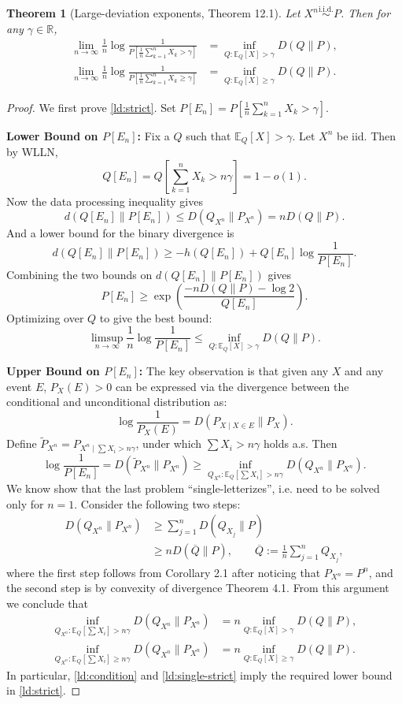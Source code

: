 \documentclass[UTF8,11pt,a4paper]{ctexart}
\newtheorem*{theorem}{Theorem}
\theoremstyle{definition}\newtheorem*{definition}{Definition}
\theoremstyle{remark}\newtheorem*{remark}{Remark}
\newcommand{\R}{\mathbb R}
\newcommand{\E}{\mathbb E}
\begin{document}
\begin{theorem}[Large-deviation exponents, Theorem 12.1]
Let $X^n\stackrel{\mathrm{i.i.d.}}{\sim}P$. Then for any $\gamma\in\R$,
\begin{align}
\lim_{n\to\infty}\frac1n\log\frac1{P[\frac1n\sum_{k=1}^n X_k>\gamma]}
&=\inf_{Q:\E_Q[X]>\gamma}D(Q\|P),\label{ld:strict}\\
\lim_{n\to\infty}\frac1n\log\frac1{P[\frac1n\sum_{k=1}^n X_k\ge\gamma]}
&=\inf_{Q:\E_Q[X]\ge\gamma}D(Q\|P).\label{ld:closed}
\end{align}
\end{theorem}
\begin{proof}
We first prove \eqref{ld:strict}. Set $P[E_n]=P[\frac1n\sum_{k=1}^nX_k>\gamma]$.

\textbf{Lower Bound on $P[E_n]$:} Fix a $Q$ such that $\E_Q[X]>\gamma$. Let $X^n$ be iid. Then by WLLN,
\[
Q[E_n]=Q\left[\sum_{k=1}^nX_k>n\gamma\right]=1-o(1).
\]
Now the data processing inequality gives
\[
d(Q[E_n]\|P[E_n])\le D(Q_{X^n}\|P_{X^n})=nD(Q\|P).
\]
And a lower bound for the binary divergence is
\[
d(Q[E_n]\|P[E_n])\ge-h(Q[E_n])+Q[E_n]\log\frac1{P[E_n]}.
\]
Combining the two bounds on $d(Q[E_n]\|P[E_n])$ gives
\begin{equation}\label{ld:change}
P[E_n]\ge\exp\left(\frac{-nD(Q\|P)-\log2}{Q[E_n]}\right).
\end{equation}
Optimizing over $Q$ to give the best bound:
\[
\limsup_{n\to\infty}\frac1n\log\frac1{P[E_n]}
\le\inf_{Q:\E_Q[X]>\gamma}D(Q\|P).
\]

\textbf{Upper Bound on $P[E_n]$:} The key observation is that given any $X$ and any event $E$, $P_X(E)>0$ can be expressed via the divergence between the conditional and unconditional distribution as:
\[
\log\frac1{P_X(E)}=D(P_{X\mid X\in E}\|P_X).
\]
Define $\widetilde P_{X^n}=P_{X^n\mid\sum X_i>n\gamma}$, under which $\sum X_i>n\gamma$ holds a.s. Then
\begin{equation}\label{ld:condition}
\log\frac1{P[E_n]}=D(\widetilde P_{X^n}\|P_{X^n})
\ge\inf_{Q_{X^n}:\E_Q[\sum X_i]>n\gamma}D(Q_{X^n}\|P_{X^n}).
\end{equation}
We know show that the last problem ``single-letterizes'', i.e. need to be solved only for $n=1$. Consider the following two steps:
\begin{align}
D(Q_{X^n}\|P_{X^n})&\ge\sum_{j=1}^nD(Q_{X_j}\|P)\label{ld:product}\\
&\ge nD(\overline Q\|P),\qquad
\overline Q\mathrel{:=}\frac1n\sum_{j=1}^nQ_{X_j},\label{ld:convex}
\end{align}
where the first step follows from Corollary 2.1 after noticing that $P_{X^n}=P^n$, and the second step is by convexity of divergence Theorem 4.1. From this argument we conclude that
\begin{align}
\inf_{Q_{X^n}:\E_Q[\sum X_i]>n\gamma}D(Q_{X^n}\|P_{X^n})
&=n\inf_{Q:\E_Q[X]>\gamma}D(Q\|P),\label{ld:single-strict}\\
\inf_{Q_{X^n}:\E_Q[\sum X_i]\ge n\gamma}D(Q_{X^n}\|P_{X^n})
&=n\inf_{Q:\E_Q[X]\ge\gamma}D(Q\|P).\label{ld:single-closed}
\end{align}
In particular, \eqref{ld:condition} and \eqref{ld:single-strict} imply the required lower bound in \eqref{ld:strict}.


\end{proof}
\end{document}

